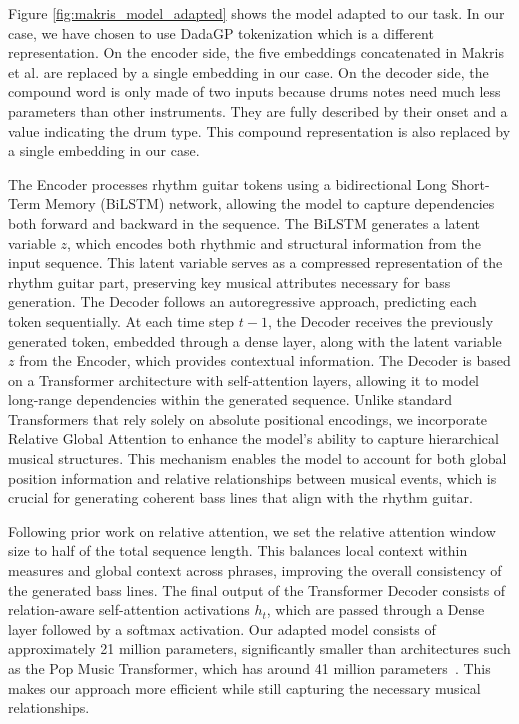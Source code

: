 Figure \ref{fig:makris_model_adapted} shows the model adapted to our task.
In our case, we have chosen to use DadaGP tokenization which is a different representation.
On the encoder side, the five embeddings concatenated in Makris et al. are replaced by a single embedding in our case.
On the decoder side, the compound word is only made of two inputs because drums notes need much less parameters than other instruments.
They are fully described by their onset and a value indicating the drum type.
This compound representation is also replaced by a single embedding in our case.

The Encoder processes rhythm guitar tokens using a bidirectional Long Short-Term Memory (BiLSTM) network, allowing the model to capture dependencies both forward and backward in the sequence.
The BiLSTM generates a latent variable \( z \), which encodes both rhythmic and structural information from the input sequence.
This latent variable serves as a compressed representation of the rhythm guitar part, preserving key musical attributes necessary for bass generation.  
The Decoder follows an autoregressive approach, predicting each token sequentially.
At each time step \( t-1 \), the Decoder receives the previously generated token, embedded through a dense layer, along with the latent variable \( z \) from the Encoder, which provides contextual information.
The Decoder is based on a Transformer architecture with self-attention layers, allowing it to model long-range dependencies within the generated sequence.
Unlike standard Transformers that rely solely on absolute positional encodings, we incorporate Relative Global Attention to enhance the model's ability to capture hierarchical musical structures.
This mechanism enables the model to account for both global position information and relative relationships between musical events, which is crucial for generating coherent bass lines that align with the rhythm guitar.  

Following prior work on relative attention, we set the relative attention window size to half of the total sequence length.
This balances local context within measures and global context across phrases, improving the overall consistency of the generated bass lines.
The final output of the Transformer Decoder consists of relation-aware self-attention activations \( h_t \), which are passed through a Dense layer followed by a softmax activation.
Our adapted model consists of approximately 21 million parameters, significantly smaller than architectures such as the Pop Music Transformer, which has around 41 million parameters~\cite{huang_pop_2020}.
This makes our approach more efficient while still capturing the necessary musical relationships.  

